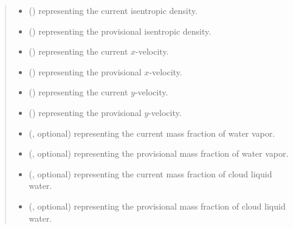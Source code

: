\documentclass[letterpaper,10pt,english]{sphinxmanual}
\begin{document}
\begin{fulllineitems}
\begin{fulllineitems}
\begin{quote}
\begin{description}
\begin{itemize}
\item {} 
 () \textendash{}  representing the current isentropic density.

\item {} 
 () \textendash{}  representing the provisional isentropic density.

\item {} 
 () \textendash{}  representing the current \(x\)-velocity.

\item {} 
 () \textendash{}  representing the provisional \(x\)-velocity.

\item {} 
 () \textendash{}  representing the current \(y\)-velocity.

\item {} 
 () \textendash{}  representing the provisional \(y\)-velocity.

\item {} 
 (, optional) \textendash{}  representing the current mass fraction of water vapor.

\item {} 
 (, optional) \textendash{}  representing the provisional mass fraction of water vapor.

\item {} 
 (, optional) \textendash{}  representing the current mass fraction of cloud liquid water.

\item {} 
 (, optional) \textendash{}  representing the provisional mass fraction of cloud liquid water.


\end{itemize}
\end{description}
\end{quote}
\end{fulllineitems}
\end{fulllineitems}
\end{document}
